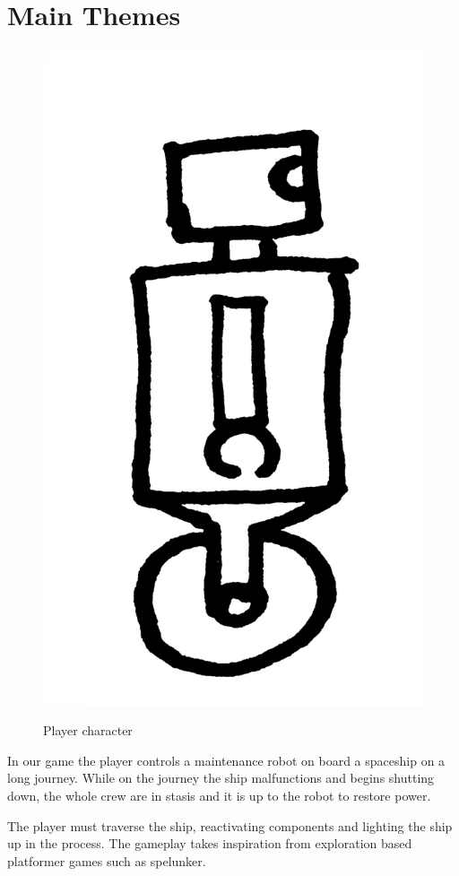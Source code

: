 \section{Main Themes}

\begin{figure}[ht]
\centering
\includegraphics[scale=0.06, trim = 0cm 0cm 0cm 2cm]{images/robot}
\label{fig:player}
\caption{Player character}
\end{figure}

In our game the player controls a maintenance robot on board a spaceship on a long journey. While on the journey the ship malfunctions and begins shutting down, the whole crew are in stasis and it is up to the robot to restore power.

The player must traverse the ship, reactivating components and lighting the ship up in the process. The gameplay takes inspiration from exploration based platformer games such as spelunker.